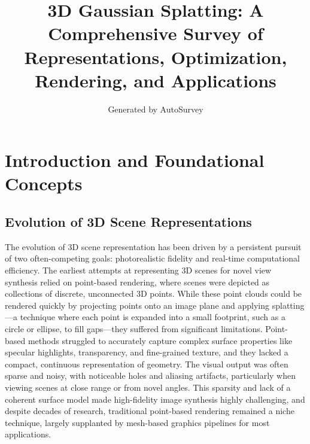 \documentclass[11pt]{article}
\title{3D Gaussian Splatting: A Comprehensive Survey of Representations, Optimization, Rendering, and Applications}
\author{Generated by AutoSurvey}
\date{}
\begin{document}
\maketitle
\tableofcontents
\newpage

\section{Introduction and Foundational Concepts}

\subsection{Evolution of 3D Scene Representations}

The evolution of 3D scene representation has been driven by a persistent pursuit of two often-competing goals: photorealistic fidelity and real-time computational efficiency. The earliest attempts at representing 3D scenes for novel view synthesis relied on point-based rendering, where scenes were depicted as collections of discrete, unconnected 3D points. While these point clouds could be rendered quickly by projecting points onto an image plane and applying splatting---a technique where each point is expanded into a small footprint, such as a circle or ellipse, to fill gaps---they suffered from significant limitations. Point-based methods struggled to accurately capture complex surface properties like specular highlights, transparency, and fine-grained texture, and they lacked a compact, continuous representation of geometry. The visual output was often sparse and noisy, with noticeable holes and aliasing artifacts, particularly when viewing scenes at close range or from novel angles. This sparsity and lack of a coherent surface model made high-fidelity image synthesis highly challenging, and despite decades of research, traditional point-based rendering remained a niche technique, largely supplanted by mesh-based graphics pipelines for most applications.
\end{document}
